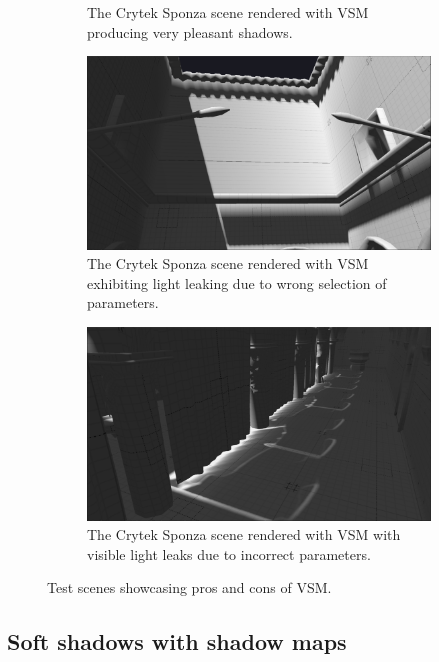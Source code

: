 \begin{figure}[h]
\begin{subfigure}[t]{0.49\textwidth}
        \caption{The Crytek Sponza scene rendered with VSM producing very pleasant shadows.}
    \end{subfigure}
    \begin{subfigure}[t]{0.49\textwidth}
		\centering
        \includegraphics[width=\textwidth]{./graf/tests/vsm/cropped/sponza_vsm_4096_23_badsetup.png}
        \caption{The Crytek Sponza scene rendered with VSM exhibiting light leaking due to wrong selection of parameters.}
    \end{subfigure}
	\hfill
    \begin{subfigure}[t]{0.49\textwidth}
		\centering
        \includegraphics[width=\textwidth]{./graf/tests/vsm/cropped/sponza_vsm_4096_23_leaks.png}
        \caption{The Crytek Sponza scene rendered with VSM with visible light leaks due to incorrect parameters.}
    \end{subfigure}

    \caption{Test scenes showcasing pros and cons of VSM.}
    \label{fig:test_vsm_screens}
\end{figure}

\subsection{Soft shadows with shadow maps}

